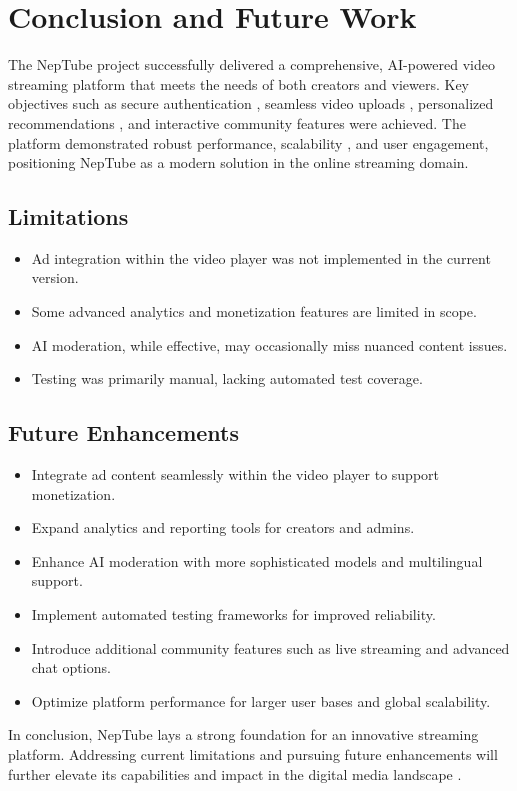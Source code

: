 \chapter{Conclusion and Future Work}

The NepTube project successfully delivered a comprehensive, AI-powered video streaming platform that meets the needs of both creators and viewers. Key objectives such as secure authentication \cite{clerk2024docs}, seamless video uploads \cite{uploadthing2024docs}, personalized recommendations \cite{covington2016deep, koren2009matrix}, and interactive community features were achieved. The platform demonstrated robust performance, scalability \cite{wang2019webscale}, and user engagement, positioning NepTube as a modern solution in the online streaming domain.

\section{Limitations}

\begin{itemize}[leftmargin=2cm]
  \item Ad integration within the video player was not implemented in the current version.
  \item Some advanced analytics and monetization features are limited in scope.
  \item AI moderation, while effective, may occasionally miss nuanced content issues.
  \item Testing was primarily manual, lacking automated test coverage.
\end{itemize}

\section{Future Enhancements}

\begin{itemize}[leftmargin=2cm]
  \item Integrate ad content seamlessly within the video player to support monetization.
  \item Expand analytics and reporting tools for creators and admins.
  \item Enhance AI moderation with more sophisticated models \cite{risch2020toxic} and multilingual support.
  \item Implement automated testing frameworks for improved reliability.
  \item Introduce additional community features such as live streaming and advanced chat options.
  \item Optimize platform performance for larger user bases and global scalability.
\end{itemize}

In conclusion, NepTube lays a strong foundation for an innovative streaming platform. Addressing current limitations and pursuing future enhancements will further elevate its capabilities and impact in the digital media landscape \cite{elinext2025ai}.
